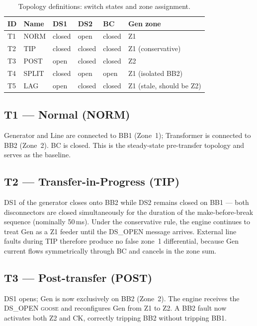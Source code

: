 \documentclass[11pt,a4paper]{article}
\newcommand{\goose}{\textsc{goose}}
\begin{document}
\begin{table}[h]
  \centering
  \caption{Topology definitions: switch states and zone assignment.}
  \label{tab:topologies}
  \begin{tabular}{llllll}
    \toprule
    ID & Name & DS1 & DS2 & BC & Gen zone \\
    \midrule
    T1 & NORM  & closed & open   & closed & Z1 \\
    T2 & TIP   & closed & closed & closed & Z1 (conservative) \\
    T3 & POST  & open   & closed & closed & Z2 \\
    T4 & SPLIT & closed & open   & open   & Z1 (isolated BB2) \\
    T5 & LAG   & open   & closed & closed & Z1 (stale, should be Z2) \\
    \bottomrule
  \end{tabular}
\end{table}

\subsection{T1 --- Normal (NORM)}

Generator and Line are connected to BB1 (Zone~1); Transformer is connected
to BB2 (Zone~2).  BC is closed.  This is the steady-state pre-transfer
topology and serves as the baseline.

\subsection{T2 --- Transfer-in-Progress (TIP)}

DS1 of the generator closes onto BB2 while DS2 remains closed on BB1 ---
both disconnectors are closed simultaneously for the duration of the
make-before-break sequence (nominally 50\,ms).  Under the conservative
rule, the engine continues to treat Gen as a Z1 feeder until the DS\_OPEN
message arrives.  External line faults during TIP therefore produce no
false zone~1 differential, because Gen current flows symmetrically through
BC and cancels in the zone sum.

\subsection{T3 --- Post-transfer (POST)}

DS1 opens; Gen is now exclusively on BB2 (Zone~2).  The engine receives
the DS\_OPEN \goose{} and reconfigures Gen from Z1 to Z2.  A BB2 fault
now activates both Z2 and CK, correctly tripping BB2 without tripping BB1.
\end{document}

